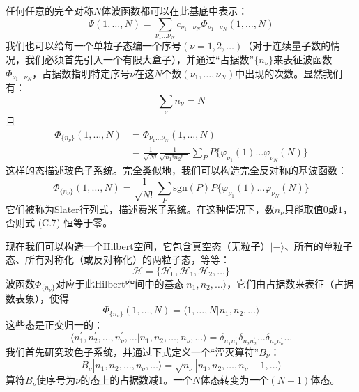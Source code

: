 任何任意的完全对称$N$体波函数都可以在此基底中表示：
\begin{equation}
\Psi(1,\dots,N)=\sum_{\nu_{1}\dots\nu_{N}}c_{\nu_{1}\dots\nu_{N}}\Phi_{\nu_{1}\dots\nu_{N}}(1,\dots,N)\label{eq:appendix_c_arbitrary_symmetric_wf}
\end{equation}
我们也可以给每一个单粒子态编一个序号$(\nu=1,2,\dots)$（对于连续量子数的情况，我们必须首先引入一个有限大盒子），并通过“占据数”$\{n_{\nu}\}$来表征波函数$\Phi_{\nu_{1}\dots\nu_{N}}$，占据数指明特定序号$\nu$在这$N$个数$(\nu_{1},\dots,\nu_{N})$中出现的次数。显然我们有：
\begin{equation}
\sum_{\nu}n_{\nu}=N\label{eq:appendix_c_total_number}
\end{equation}
且
\begin{align}
\Phi_{\{n_{\nu}\}}(1,\dots,N) & =\Phi_{\nu_{1}\dots\nu_{N}}(1,\dots,N)\nonumber \\
 & =\frac{1}{\sqrt{N!}}\frac{1}{\sqrt{n_{1}!n_{2}!\dots}}\sum_{P}P\{\varphi_{\nu_{1}}(1)\dots\varphi_{\nu_{N}}(N)\}\label{eq:appendix_c_boson_occupation_rep}
\end{align}
这样的态描述玻色子系统。完全类似地，我们可以构造完全反对称的基波函数：
\begin{equation}
\Phi_{\{n_{\nu}\}}(1,\dots,N)=\frac{1}{\sqrt{N!}}\sum_{P}\mathrm{sgn}(P)P\{\varphi_{\nu_{1}}(1)\dots\varphi_{\nu_{N}}(N)\}\label{eq:appendix_c_slater_det}
\end{equation}
它们被称为Slater行列式，描述费米子系统。在这种情况下，数$n_{\nu}$只能取值$0$或$1$，否则式 (C.7) 恒等于零。

现在我们可以构造一个Hilbert空间，它包含真空态（无粒子）$|-\rangle$、所有的单粒子态、所有对称化（或反对称化）的两粒子态，等等：
\begin{equation}
\mathcal{H}=\{\mathcal{H}_{0},\mathcal{H}_{1},\mathcal{H}_{2},\dots\}\label{eq:appendix_c_fock_space}
\end{equation}
波函数$\Phi_{\{n_{\nu}\}}$对应于此Hilbert空间中的基态$|n_{1},n_{2},\dots\rangle$，它们由占据数来表征（占据数表象），使得
\begin{equation}
\Phi_{\{n_{\nu}\}}(1,\dots,N)=\langle1,\dots,N|n_{1},n_{2},\dots\rangle\label{eq:appendix_c_overlap_basis}
\end{equation}
这些态是正交归一的：
\begin{equation}
\langle n^{\prime}_{1},n^{\prime}_{2},\dots,n^{\prime}_{\nu},\dots|n_{1},n_{2},\dots,n_{\nu},\dots\rangle=\delta_{n_{1}n^{\prime}_{1}}\delta_{n_{2}n^{\prime}_{2}}\dots\delta_{n_{\nu}n^{\prime}_{\nu}}\dots\label{eq:appendix_c_orthonormality}
\end{equation}
我们首先研究玻色子系统，并通过下式定义一个“湮灭算符”$B_{\nu}$：
\begin{equation}
B_{\nu}|n_{1},n_{2},\dots,n_{\nu},\dots\rangle=\sqrt{n_{\nu}}|n_{1},n_{2},\dots,n_{\nu}-1,\dots\rangle\label{eq:appendix_c_boson_annihilation}
\end{equation}
算符$B_{\nu}$使序号为$\nu$的态上的占据数减$1$。一个$N$体态转变为一个$(N-1)$体态。

